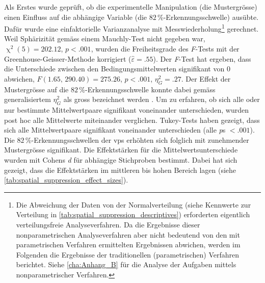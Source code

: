 \documentclass[11pt, twoside, a4paper]{book}		%
\begin{document}
Als Erstes wurde geprüft, ob die experimentelle Manipulation (die Mustergrösse) einen Einfluss auf die abhängige Variable (die $82\,\%$-Er\-ken\-nungs\-schwel\-le) ausübte. Dafür wurde eine einfaktorielle Varianzanalyse mit Messwiederholung\footnote{Die Abweichung der Daten von der Normalverteilung (siehe Kennwerte zur Verteilung in \autoref{tab:spatial_suppression_descriptives}) erforderten eigentlich verteilungsfreie Analyseverfahren. Da die Ergebnisse dieser nonparametrischen Analyseverfahren aber nicht bedeutend von den mit parametrischen Verfahren ermittelten Ergebnissen abwichen, werden im Folgenden die Ergebnisse der traditionellen (parametrischen) Verfahren berichtet. Siehe \autoref{cha:Anhang_B} für die Analyse der Aufgaben mittels nonparametrischer Verfahren.}
gerechnet. Weil Sphärizität gemäss einem Mauchly-Test nicht gegeben war, $\upchi^2(5)=202.12$, $p<.001$, wurden die Freiheitsgrade des \textit{F}-Tests mit der Greenhouse-Geisser-Methode korrigiert ($\hat{\varepsilon}=.55$).
Der \textit{F}-Test hat ergeben, dass die Unterschiede zwischen den Bedingungsmittelwerten signifikant von 0 abwichen, $F(1.65,\,290.40)=275.26$, $p<.001$, $\eta_{G}^2=.27$. Der Effekt der Mustergrösse auf die $82\,\%$-Erkennungsschwelle konnte dabei gemäss generalisiertem $\eta_{G}^2$ \citep{Olejnik2003} als gross bezeichnet werden \citep[S. 383]{Bakeman2005}.
Um zu erfahren, ob sich alle oder nur bestimmte Mittelwertpaare signifikant voneinander unterschieden, wurden post hoc alle Mittelwerte miteinander verglichen.
Tukey-Tests haben gezeigt, dass sich alle Mittelwertpaare signifikant voneinander unterschieden (alle \textit{p}s $<.001$).
Die $82\,\%$-Er\-ken\-nungs\-schwel\-len der \glspl{vp} erhöhten sich folglich mit zunehmender Mustergrösse signifikant.
Die Effektstärken für die Mittelwertsunterschiede wurden mit Cohens \textit{d} für abhängige Stichproben \citep{Gibbons1993} bestimmt. 
Dabei hat sich gezeigt, dass die Effektstärken im mittleren bis hohen Bereich \citep[][S. 40]{Cohen1988} lagen (siehe \autoref{tab:spatial_suppression_effect_sizes}). 
\end{document}
